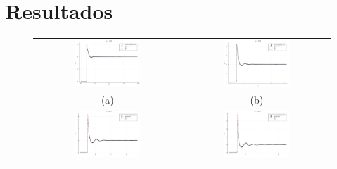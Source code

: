 \section{Resultados}

\begin{figure}[p]
    \begin{tabular}{cc}
        \includegraphics[width=0.47\textwidth]{figuras/capitulo-3/p=0.15.pdf} & 
        \includegraphics[width=0.47\textwidth]{figuras/capitulo-3/p=0.25.pdf} \\
        (a) & (b) \\[6pt]
        \includegraphics[width=0.47\textwidth]{figuras/capitulo-3/p=0.35.pdf} &   \includegraphics[width=0.47\textwidth]{figuras/capitulo-3/p=0.45.pdf} \\

\end{tabular}
\end{figure}
